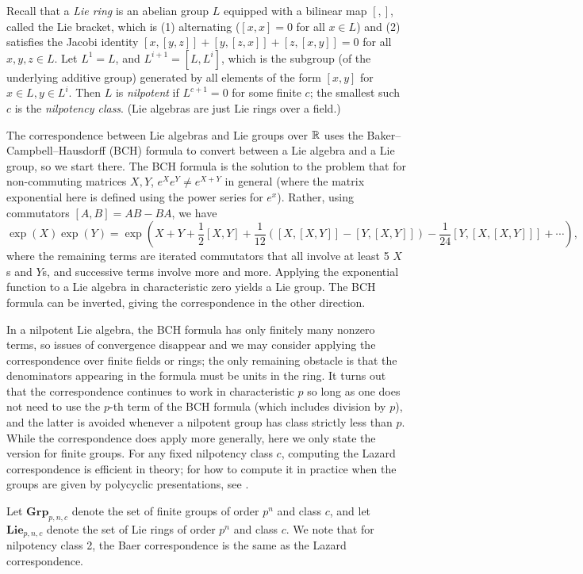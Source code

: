 \documentclass[11pt]{article}
\begin{document}
Recall that a \emph{Lie ring} is an abelian group $L$ equipped with a bilinear map $[,]$, called the Lie bracket, which is (1) alternating ($[x,x]=0$ for all $x \in L$) and (2) satisfies the Jacobi identity $[x,[y,z]] + [y,[z,x]] + [z,[x,y]] = 0$ for all $x,y,z \in L$. Let $L^1 = L$, and $L^{i+1} = [L,L^i]$, which is the subgroup (of the underlying additive group) generated by all elements of the form $[x,y]$ for $x \in L, y \in L^{i}$. Then $L$ is \emph{nilpotent} if $L^{c+1}=0$ for some finite $c$; the smallest such $c$ is the \emph{nilpotency class}. (Lie algebras are just Lie rings over a field.)

The correspondence between Lie algebras and Lie groups over $\mathbb{R}$ uses the Baker--Campbell--Hausdorff (BCH)
formula to convert between a Lie algebra and a Lie group, so we start there. The BCH formula is the solution to the problem that for non-commuting matrices $X,Y$, $e^X e^Y \neq e^{X + Y}$ in general (where the matrix exponential here is defined using the power series for $e^x$). Rather, using commutators $[A,B] = AB - BA$, we have
\[
\exp(X) \exp(Y) = \exp\left(X + Y + \frac12 [X,Y] + \frac{1}{12}\left([X,[X,Y]] - [Y, [X,Y]] \right) - \frac{1}{24} [Y, [X, [X, Y]]] + \dotsb\right),
\]
where the remaining terms are iterated commutators that all involve at least 5 $X$s and $Y$s, and successive terms involve more and more.  Applying the exponential function to a Lie algebra in characteristic zero yields a Lie group. The BCH formula can be inverted, giving the correspondence in the other direction.

In a nilpotent Lie algebra, the BCH formula has only finitely many nonzero terms, so issues of convergence disappear and we may consider applying the correspondence over finite fields or rings; the only remaining obstacle is that the denominators appearing in the formula must be units in the ring. It turns out that the correspondence 
continues to work in characteristic $p$ so long as one does not need to use the 
$p$-th term of the BCH formula (which includes division by $p$), and the latter is 
avoided whenever a nilpotent group has class strictly less than $p$. While the 
correspondence does apply more generally, here we only state the version for 
finite groups. For any fixed nilpotency class $c$, computing the Lazard 
correspondence is efficient in theory; for how to compute it in practice when the groups are given by polycyclic presentations, 
see \cite{cicaloEtAl}.

Let $\mathbf{Grp}_{p,n,c}$ denote the set of finite groups of order $p^n$ and class $c$, and let $\mathbf{Lie}_{p,n,c}$ denote the set of Lie rings of order $p^n$ and class $c$. We note that for nilpotency class 2, the Baer correspondence is the same as the Lazard correspondence.
\end{document}
